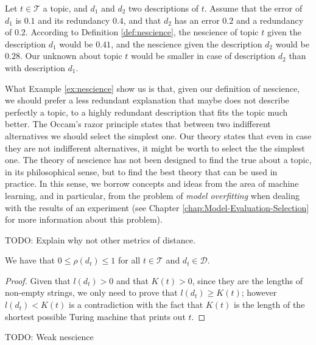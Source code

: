 {\color{red}

\begin{example}
\label{ex:nescience}
Let $t \in \mathcal{T}$ a topic, and $d_1$ and $d_2$ two descriptions of $t$. Assume that the error of $d_1$ is $0.1$ and its redundancy $0.4$, and that $d_2$ has an error $0.2$ and a redundancy of $0.2$. According to Definition \ref{def:nescience}, the nescience of topic $t$ given the description $d_1$ would be $0.41$, and the nescience given the description $d_2$ would be $0.28$. Our unknown about topic $t$ would be smaller in case of description $d_2$ than with description $d_1$.
\end{example}

What Example \ref{ex:nescience} show us is that, given our definition of nescience, we should prefer a less redundant explanation that maybe does not describe perfectly a topic, to a highly redundant description that fits the topic much better. The Occam's razor principle states that between two indifferent alternatives we should select the simplest one. Our theory states that even in case they are not indifferent alternatives, it might be worth to select the the simplest one. The theory of nescience has not been designed to find the true about a topic, in its philosophical sense, but to find the best theory that can be used in practice. In this sense, we borrow concepts and ideas from the area of machine learning, and in particular, from the problem of \emph{model overfitting} when dealing with the results of an experiment (see Chapter \ref{chap:Model-Evaluation-Selection} for more information about this problem).

{\color{red} TODO: Explain why not other metrics of distance.}

\begin{proposition}
\label{prop:range_redundancy}
We have that $0 \leq \rho(d_t) \leq 1$ for all $t \in \mathcal{T}$ and $d_t \in \mathcal{D}$.
\end{proposition}
\begin{proof}
Given that $l\left(d_t\right)>0$ and that $K\left(t\right)>0$, since they are the lengths of non-empty strings, we only need to prove that $l\left(d_t\right) \geq K\left(t\right)$; however $l\left(d_t\right) < K\left(t\right)$ is a contradiction with the fact that $K\left(t\right)$ is the length of the shortest possible Turing machine that prints out $t$.
\end{proof}

TODO: Weak nescience


}
